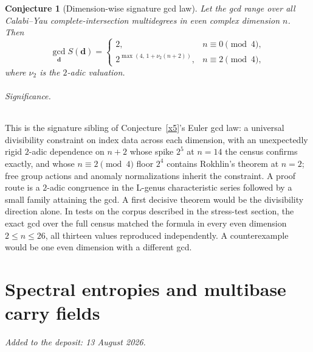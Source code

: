\documentclass[11pt]{article}
\newtheorem{conjecture}{Conjecture}
\theoremstyle{definition}
\begin{document}
\begin{conjecture}[Dimension-wise signature gcd law]\label{aa20}
Let the gcd range over all Calabi--Yau complete-intersection multidegrees in even complex dimension $n$.  Then
\[
\gcd_{\mathbf d}S(\mathbf d)=
\begin{cases}
2,&n\equiv0\pmod4,\\
2^{\max(4,\,1+\nu_2(n+2))},&n\equiv2\pmod4,
\end{cases}
\]
where $\nu_2$ is the $2$-adic valuation.
\end{conjecture}

\paragraph{Significance.}
This is the signature sibling of Conjecture~\ref{x5}'s Euler gcd law: a universal divisibility constraint on index data across each dimension, with an unexpectedly rigid $2$-adic dependence on $n+2$ whose spike $2^5$ at $n=14$ the census confirms exactly, and whose $n\equiv2\pmod4$ floor $2^4$ contains Rokhlin's theorem at $n=2$; free group actions and anomaly normalizations inherit the constraint.  A proof route is a $2$-adic congruence in the L-genus characteristic series followed by a small family attaining the gcd.  A first decisive theorem would be the divisibility direction alone.  In tests on the corpus described in the stress-test section, the exact gcd over the full census matched the formula in every even dimension $2\le n\le26$, all thirteen values reproduced independently.  A counterexample would be one even dimension with a different gcd.

\part{Spectral entropies and multibase carry fields}

\medskip\noindent\emph{Added to the deposit: 13 August 2026.}\par\medskip
\end{document}

